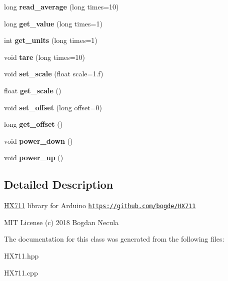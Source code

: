 \begin{DoxyCompactItemize}
long {\bfseries read\+\_\+average} (long times=10)
\item 
\mbox{\label{classHX711_a97b8fac46c08389040c0a2e45e9079ba}} 
long {\bfseries get\+\_\+value} (long times=1)
\item 
\mbox{\label{classHX711_a52c3c5ae803b6ad578788eaf7f8da14c}} 
int {\bfseries get\+\_\+units} (long times=1)
\item 
\mbox{\label{classHX711_acf2574e9ceee9213e36ab22cbbb3f6fe}} 
void {\bfseries tare} (long times=10)
\item 
\mbox{\label{classHX711_ab306a159731da353f6123d1681a86c09}} 
void {\bfseries set\+\_\+scale} (float scale=1.f)
\item 
\mbox{\label{classHX711_afd7db8219fd9f5d17160aafa18584f98}} 
float {\bfseries get\+\_\+scale} ()
\item 
\mbox{\label{classHX711_ac4cf05b37725043f11c338227a328893}} 
void {\bfseries set\+\_\+offset} (long offset=0)
\item 
\mbox{\label{classHX711_a96f14aeeed56b93aebe973a4e601f027}} 
long {\bfseries get\+\_\+offset} ()
\item 
\mbox{\label{classHX711_ad41a2054279164a0322ac4e1a17fef9b}} 
void {\bfseries power\+\_\+down} ()
\item 
\mbox{\label{classHX711_a6fdabd2ecaa3a461d52731f7cbc0d1c0}} 
void {\bfseries power\+\_\+up} ()
\end{DoxyCompactItemize}


\subsection{Detailed Description}
\hyperlink{classHX711}{H\+X711} library for Arduino \href{https://github.com/bogde/HX711}{\tt https\+://github.\+com/bogde/\+H\+X711}

M\+IT License (c) 2018 Bogdan Necula 

The documentation for this class was generated from the following files\+:\begin{DoxyCompactItemize}
\item 
H\+X711.\+hpp\item 
H\+X711.\+cpp\end{DoxyCompactItemize}
